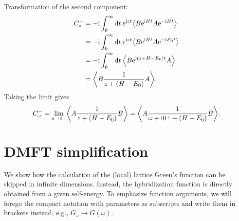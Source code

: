 Transformation of the second component:
\begin{align}
    C^-_z
     & =
    -\mi \int_0^\infty \md t \>
    \me^{\mi zt} \expval*{B \me^{\mi Ht} A \me^{-\mi Ht}}   \\
     & =
    -\mi \int_0^\infty \md t \>
    \me^{\mi zt} \expval*{B \me^{\mi Ht} A \me^{-\mi E_0t}} \\
     & =
    -\mi \int_0^\infty \md t \>
    \expval*{B \me^{\mi(z + H - E_0)t} A}                   \\
     & =
    \expval*{B \frac{1}{z + (H - E_0)} A}.
\end{align}
Taking the limit gives
\begin{equation}
    C^-_\omega
    =
    \lim_{\delta\to0^+} \expval*{A \frac{1}{z + (H - E_0)} B}
    =
    \expval*{A \frac{1}{\omega + \mi0^+ + (H - E_0)} B}.
\end{equation}

\section{DMFT simplification}%
\label{app:dmft-simplification}

We show how the calculation of the (local) lattice Green's function
can be skipped in infinite dimensions.
Instead, the hybridization function is directly obtained from a given self-energy.
To emphasize function arguments,
we will forego the compact notation with parameters as subscripts
and write them in brackets instead,
e.g., $G_\omega \to G(\omega)$.

